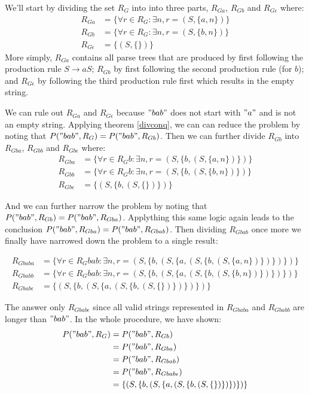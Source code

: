 \documentclass[11pt]{article}
\begin{document}
We'll start by dividing the set $R_G$ into into three parts,
$R_{Ga}$, $R_{Gb}$ and $R_{G\epsilon}$ where:
\begin{align*}
R_{Ga} &= \{ \forall r \in R_G : \exists n , r = (S, \{a,n\}) \}\\
R_{Gb} &= \{ \forall r \in R_G : \exists n , r = (S, \{b,n\}) \}\\
R_{G\epsilon} &= \{ (S, \{\}) \}
\end{align*}
More simply, $R_{Ga}$ contains all parse trees that are produced by first following the production rule $S \rightarrow a S$;
$R_{Gb}$ by first following the second production rule (for $b$); and $R_{G\epsilon}$ by following the third production rule first
which results in the empty string.

We can rule out $R_{Ga}$ and $R_{G\epsilon}$ because $"bab"$ does not start with $"a"$ and is not an empty string.
Applying theorem \ref{divconq}, we can can reduce the problem by noting that $P("bab", R_G) = P("bab", R_{Gb})$.
Then we can further divide $R_{Gb}$ into $R_{Gba}$, $R_{Gbb}$ and $R_{Gb\epsilon}$ where:
\begin{align*}
R_{Gba} &= \{ \forall r \in R_Gb : \exists n , r = (S, \{b, (S, \{a,n\})\}) \} \\
R_{Gbb} &= \{ \forall r \in R_Gb : \exists n , r = (S, \{b, (S, \{b,n\})\}) \} \\
R_{Gb\epsilon} &= \{ (S, \{b, (S, \{\})\}) \}
\end{align*}

And we can further narrow the problem by noting that $P("bab", R_{Gb}) = P("bab", R_{Gba})$.
Applything this same logic again leads to the conclusion $P("bab", R_{Gba}) = P("bab", R_{Gbab})$.
Then dividing $R_{Gbab}$ once more we finally have narrowed down the problem to a single result:

\begin{align*}
R_{Gbaba} &= \{ \forall r \in R_Gbab : \exists n , r = (S, \{b, (S, \{a, (S, \{b, (S, \{a,n\})\})\})\}) \} \\
R_{Gbabb} &= \{ \forall r \in R_Gbab : \exists n , r = (S, \{b, (S, \{a, (S, \{b, (S, \{b,n\})\})\})\}) \} \\
R_{Gbab\epsilon} &= \{ (S, \{b, (S, \{a, (S, \{b, (S, \{\})\})\})\}) \}
\end{align*}

The answer only $R_{Gbab\epsilon}$ since all valid strings represented in $R_{Gbaba}$ and $R_{Gbabb}$ are longer than $"bab"$.
In the whole procedure, we have shown:
\begin{align*}
P("bab", R_G)
&= P("bab", R_{Gb})\\
&= P("bab", R_{Gba})\\
&= P("bab", R_{Gbab})\\
&= P("bab", R_{Gbab\epsilon})\\
&= \{ (S, \{b, (S, \{a, (S, \{b, (S, \{\})\})\})\}) \}
\end{align*}

{}

\end{document}
